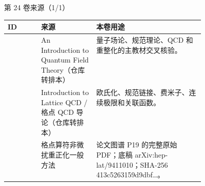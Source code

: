 \begin{frame}[t]{第 24 卷来源（1/1）}
\scriptsize\begin{tabularx}{\linewidth}{p{0.17\linewidth}p{0.28\linewidth}Y}
\toprule ID & 来源 & 本卷用途\\\midrule
{} & An Introduction to Quantum Field Theory（仓库转排本） & 量子场论、规范理论、QCD 和重整化的主教材交叉核验。\\
 & Introduction to Lattice QCD /\allowbreak{} 格点 QCD 导论（仓库转排本） & 欧氏化、规范链接、费米子、连续极限和关联函数。\\
 & 格点算符非微扰重正化一般方法 & 论文图谱 P19 的完整原始 PDF；底稿 arXiv:hep-lat/\allowbreak{}9411010；SHA-256 413c5263159d9dbf…。\\
\bottomrule\end{tabularx}\end{frame}

